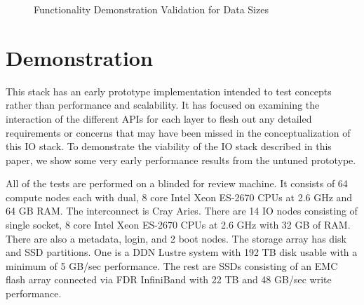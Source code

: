 \documentclass[conference]{IEEEtran} \pdfpagewidth=8.5in
\begin{document}
\begin{figure}[htbp!]
\centering
\caption{Functionality Demonstration Validation for Data Sizes}
\label{fig:eval-size}
\end{figure}

\section{Demonstration}
\label{sec:evaluation}

This stack has an early prototype implementation intended to test concepts
rather than performance and scalability. It has focused on examining the
interaction of the different APIs for each layer to flesh out any detailed
requirements or concerns that may have been missed in the conceptualization of
this IO stack. To demonstrate the viability of the IO stack described in this
paper, we show some very early performance results from the untuned prototype.

All of the tests are performed on
a blinded for review machine.
It consists
of 64 compute nodes each with dual, 8 core Intel Xeon ES-2670 CPUs at 2.6 GHz
and 64 GB RAM.  The interconnect is Cray Aries. There are 14 IO nodes
consisting of single socket, 8 core Intel Xeon ES-2670 CPUs at 2.6 GHz with 32
GB of RAM.  There are also a metadata, login, and 2 boot nodes.  The storage
array has disk and SSD partitions. One is a DDN Lustre system with 192 TB disk
usable with a minimum of 5 GB/sec performance. The rest are SSDs consisting of
an EMC flash array connected via FDR InfiniBand with 22 TB and 48 GB/sec write
performance.
\end{document}
